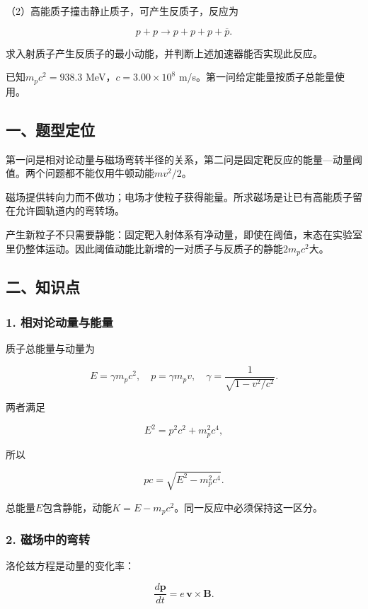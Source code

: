 \documentclass[12pt,a4paper,fontset=fandol]{ctexart}
\begin{document}
（2）高能质子撞击静止质子，可产生反质子，反应为

\[
p+p\longrightarrow p+p+p+\overline p.
\]

求入射质子产生反质子的最小动能，并判断上述加速器能否实现此反应。

已知\(m_pc^2=938.3\) MeV，\(c=3.00\times10^8\)
m/s。第一问给定能量按质子总能量使用。

\subsection{一、题型定位}\label{ux4e00ux9898ux578bux5b9aux4f4d-3}

第一问是相对论动量与磁场弯转半径的关系，第二问是固定靶反应的能量---动量阈值。两个问题都不能仅用牛顿动能\(mv^2/2\)。

磁场提供转向力而不做功；电场才使粒子获得能量。所求磁场是让已有高能质子留在允许圆轨道内的弯转场。

产生新粒子不只需要静能：固定靶入射体系有净动量，即使在阈值，末态在实验室里仍整体运动。因此阈值动能比新增的一对质子与反质子的静能\(2m_pc^2\)大。

\subsection{二、知识点}\label{ux4e8cux77e5ux8bc6ux70b9-3}

\subsubsection{1.
相对论动量与能量}\label{ux76f8ux5bf9ux8bbaux52a8ux91cfux4e0eux80fdux91cf}

质子总能量与动量为

\[
E=\gamma m_pc^2,\quad
p=\gamma m_pv,\quad
\gamma=\frac1{\sqrt{1-v^2/c^2}}.
\]

两者满足

\[
E^2=p^2c^2+m_p^2c^4,
\]

所以

\[
pc=\sqrt{E^2-m_p^2c^4}.
\]

总能量\(E\)包含静能，动能\(K=E-m_pc^2\)。同一反应中必须保持这一区分。

\subsubsection{2.
磁场中的弯转}\label{ux78c1ux573aux4e2dux7684ux5f2fux8f6c}

洛伦兹方程是动量的变化率：

\[
\frac{d\mathbf p}{dt}
=e\,\mathbf v\times\mathbf B.
\]
\end{document}
